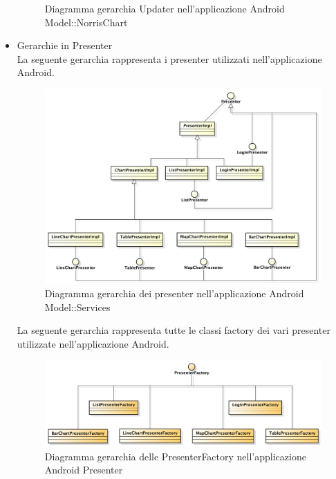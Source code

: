 \begin{itemize}
\begin{figure}[H]
                        \caption{Diagramma gerarchia Updater nell'applicazione Android Model::NorrisChart }
                    \end{figure}
                \item Gerarchie in Presenter \\
                    La seguente gerarchia rappresenta i presenter utilizzati nell'applicazione Android.
                    \begin{figure}[H]
                        \centering
                        \includegraphics[width=1\textwidth]{DefinizioneDiProdotto/Pics/Gerarchie/ApplicazionePresenter.pdf}
                        \caption{Diagramma gerarchia dei presenter nell'applicazione Android Model::Services}
                    \end{figure}
                    La seguente gerarchia rappresenta tutte le classi factory dei vari presenter utilizzate nell'applicazione Android.
                    \begin{figure}[H]
                        \centering
                        \includegraphics[width=1\textwidth]{DefinizioneDiProdotto/Pics/Gerarchie/ApplicazionePresenterFactory.pdf}
                        \caption{Diagramma gerarchia delle PresenterFactory nell'applicazione Android Presenter}

\end{figure}
\end{itemize}
